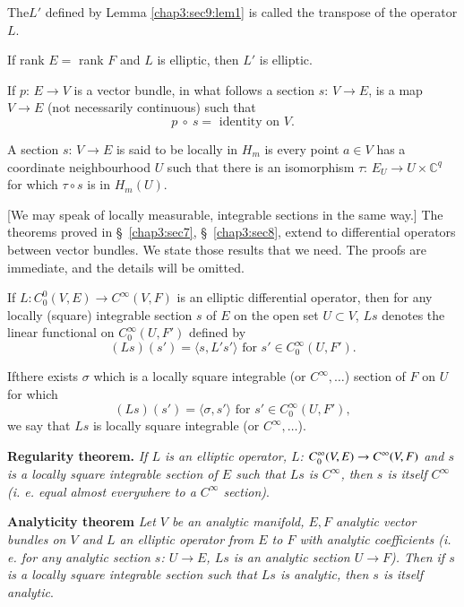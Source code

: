 \begin{defi*} %
The\pageoriginale $L'$ defined by Lemma \ref{chap3:sec9:lem1} is
called the transpose of the operator $L$. 
\end{defi*}

\begin{remarks*}
If rank $E=$ rank $F$ and $L$ is elliptic, then $L'$ is elliptic.
\end{remarks*}

If $p$: $E \to V$ is a vector bundle, in what follows a section $s$:
$V \to E$, is a map $V \to E$ (not necessarily continuous) such that  
$$
p ~ \circ ~ s = \text { identity on } V.
$$

\begin{defi*}
  A section $s$: $V \to E$ is said to be locally in $H_m$ is every
  point $a \in V$ has a coordinate neighbourhood $U$ such that there
  is an isomorphism $\tau$: $E_U \to U \times \mathbb{C}^q$ for which
  $\tau \circ s$ is in $H_m (U)$. 
\end{defi*}

[We may speak of locally measurable, integrable sections in the same
  way.] The theorems proved in \S\ \ref{chap3:sec7}, \S\
\ref{chap3:sec8}, extend to differential 
operators between vector bundles. We state those results that we
need. The proofs are immediate, and the details will be omitted. 

If $L : C^0_0 (V, E) \to C^\infty (V, F)$ is an elliptic differential
operator, then for any locally (square) integrable section $s$ of $E$
on the open set $U \subset V$, $Ls$ denotes the linear functional on
$C^\infty_0 (U, F') $ defined by 
$$
(Ls) (s') = \langle s, L' s' \rangle \text{ for } s' \in C^\infty_0 (U, F').
$$

If\pageoriginale there exists $\sigma$ which is a locally square integrable (or
$C^\infty, \ldots$) section of $F$ on $U$ for which 
$$
(Ls) (s') = \langle \sigma , s' \rangle  \text{ for } s' \in C^\infty_0 (U, F'),
$$
we say that $Ls$ is locally square integrable (or $C^\infty , \ldots$).

\medskip
\noindent
\textbf{Regularity theorem.} \textit{If $L$ is an elliptic operator,
  $L$: $C^\infty_0 (V,\break E) \to C^\infty (V, F)$ and $s$ is a locally
  square integrable section of $E$ such that $Ls$ is $C^\infty$, then
  $s$ is itself $C^\infty$ (i. e. equal almost everywhere to a
  $C^\infty$ section)}. 

\medskip
\noindent
\textbf{Analyticity theorem} \textit{Let $V$ be an analytic manifold,
  $E, F$ analytic vector bundles on $V$ and $L$ an elliptic operator
  from $E$ to $F$ with analytic coefficients (i. e. for any analytic
  section $s$: $U \to E$, $Ls$ is an analytic section $U \to F$). Then
  if $s$ is a locally square integrable section such that $Ls$ is
  analytic, then $s$ is itself analytic}. 

